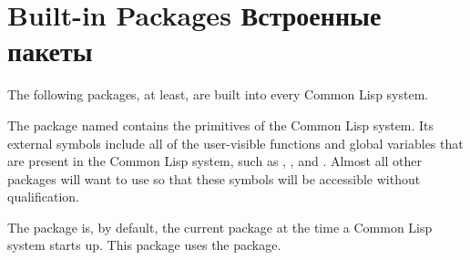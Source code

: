 \section{Built-in Packages Встроенные пакеты}

\begin{obsolete}
\noindent
The following packages, at least, are built into every Common Lisp system.

\begin{flushdesc}
\item[\cdf{lisp}]
The package named  contains the primitives of the
Common Lisp system.  Its external symbols include all of the
user-visible functions and global variables that are present in the
Common Lisp system, such as , , and .
Almost all other packages will want to use  so that these
symbols will be accessible without qualification.

\item[\cdf{user}]
The  package is, by default, the current package at the time
a Common Lisp system starts up.  This package uses the  package.
\end{flushdesc}
\end{obsolete}

